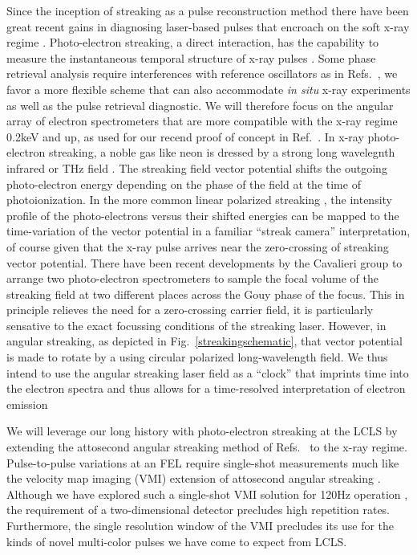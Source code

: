 Since the inception of streaking as a pulse reconstruction method \cite{Zenghu2005,KellerAngularStreaking} there have been great recent gains in diagnosing laser-based pulses that encroach on the soft x-ray regime \cite{Biegert2016,WornerSci2017,Worner2017}.
Photo-electron streaking, a direct interaction, has the capability to measure the instantaneous temporal structure of x-ray pulses \cite{Hentschel2001}.
Some phase retrieval analysis require interferences with reference oscillators as in Refs.~\cite{Zenghu2010,Cocke2013}, we favor a more flexible scheme that can also accommodate \textit{in situ} x-ray experiments as well as the pulse retrieval diagnostic.
We will therefore focus on the angular array of electron spectrometers that are more compatible with the x-ray regime 0.2keV and up, as used for our recend proof of concept in Ref.~\cite{Nick2018}.
In x-ray photo-electron streaking, a noble gas like neon is dressed by a strong long wavelegnth infrared or THz field \cite{Helml2014,Juranic2014,Schulz2015}.
The streaking field vector potential shifts the outgoing photo-electron energy depending on the phase of the field at the time of photoionization.
In the more common linear polarized streaking \cite{Helml2014,Juranic2014,Schulz2015,Matthias2016}, the intensity profile of the photo-electrons versus their shifted energies can be mapped to the time-variation of the vector potential in a familiar ``streak camera'' interpretation, of course given that the x-ray pulse arrives near the zero-crossing of streaking vector potential.
There have been recent developments by the Cavalieri group to arrange two photo-electron spectrometers to sample the focal volume of the streaking field at two different places across the Gouy phase of the focus.
This in principle relieves the need for a zero-crossing carrier field, it is particularly sensative to the exact focussing conditions of the streaking laser.
However, in angular streaking, as depicted in Fig.~\ref{streakingschematic}, that vector potential is made to rotate by a using circular polarized long-wavelength field.
We thus intend to use the angular streaking laser field as a ``clock'' that imprints time into the electron spectra and thus allows for a time-resolved interpretation of electron emission \cite{KellerNonadiabatic2013}


We will leverage our long history with photo-electron streaking at the LCLS \cite{Duesterer11,Meyer12,Helml2014} by extending the attosecond angular streaking method of Refs.~\cite{CorkumAngularStreaking,KellerAngularStreaking} to the x-ray regime.
Pulse-to-pulse variations at an FEL require single-shot measurements much like the velocity map imaging (VMI) \cite{VrakkingRSI} extension of attosecond angular streaking \cite{attoclockVMI2013}.
Although we have explored such a single-shot VMI solution for 120Hz operation \cite{Siqi2018}, the requirement of a two-dimensional detector precludes high repetition rates. 
Furthermore, the single resolution window of the VMI precludes its use for the kinds of novel multi-color pulses we have come to expect from LCLS.


